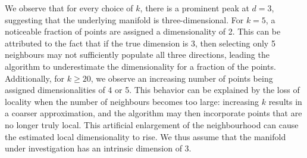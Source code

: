 \documentclass[11pt]{article}
\begin{document}
		We observe that for every choice of $k$, there is a prominent peak at $d = 3$, suggesting that the underlying manifold is three-dimensional. For $k = 5$, a noticeable fraction of points are assigned a dimensionality of 2. This can be attributed to the fact that if the true dimension is 3, then selecting only 5 neighbours may not sufficiently populate all three directions, leading the algorithm to underestimate the dimensionality for a fraction of the points. 
		Additionally, for $k \geq 20$, we observe an increasing number of points being assigned dimensionalities of 4 or 5. This behavior can be explained by the loss of locality when the number of neighbours becomes too large: increasing $k$ results in a coarser approximation, and the algorithm may then incorporate points that are no longer truly local. This artificial enlargement of the neighbourhood can cause the estimated local dimensionality to rise.
		We thus assume that the manifold under investigation has an intrinsic dimension of 3.
		
		
\end{document}
